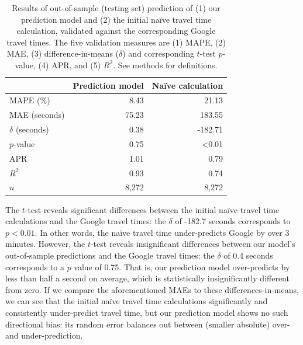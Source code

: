 \documentclass[12pt,letterpaper]{article} %
\begin{document}
\begin{table}[tb!]
    \centering
    \caption{Results of out-of-sample (testing set) prediction of (1) our prediction model and (2) the initial naïve travel time calculation, validated against the corresponding Google travel times. The five validation measures are (1) MAPE, (2) MAE, (3) difference-in-means ($\delta$) and corresponding $t$-test $p$-value, (4) APR, and (5) $R^2$. See methods for definitions.}\label{tab:validation_results}
    \begin{tabular}{lrr}
        \toprule
                                      & Prediction model & Naïve calculation \\
        \midrule
        MAPE (\%)                     &             8.43 &             21.13 \\
        MAE (seconds)                 &            75.23 &            183.55 \\
        $\delta$ (seconds)            &             0.38 &           -182.71 \\
        $p$-value                     &             0.75 &             <0.01 \\
        APR                           &             1.01 &              0.79 \\
        $R^2$                         &             0.93 &              0.74 \\
        \midrule
        $n$                           &           8,272 &            8,272 \\
        \bottomrule
    \end{tabular}
\end{table}

The $t$-test reveals significant differences between the initial naïve travel time calculations and the Google travel times: the $\delta$ of -182.7 seconds corresponds to $p<0.01$. In other words, the naïve travel time under-predicts Google by over 3 minutes. However, the $t$-test reveals insignificant differences between our model's out-of-sample predictions and the Google travel times: the $\delta$ of 0.4 seconds corresponds to a $p$ value of 0.75. That is, our prediction model over-predicts by less than half a second on average, which is statistically insignificantly different from zero. If we compare the aforementioned MAEs to these differences-in-means, we can see that the initial naïve travel time calculations significantly and consistently under-predict travel time, but our prediction model shows no such directional bias: its random error balances out between (smaller absolute) over-and under-prediction.
\end{document}
